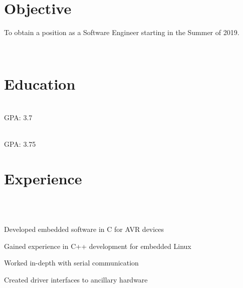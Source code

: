 \documentclass[]{deedy-resume-openfont}
\begin{document}
    
%
%
%
%
\section{Objective}
\raggedright
{}
To obtain a position as a Software Engineer starting in the Summer of 2019.

\descript{}\hfill \location{}\\
\section{Education}
\raggedright

\hfill {}\\
GPA: 3.7\\
\sectionsep
  

\hfill {}\\
GPA: 3.75\\
\sectionsep
%
%
\section{Experience}
\hfill{}\\
\hfill {}\\
\begin{tightemize}
	\item Developed embedded software in C for AVR devices
    \item Gained experience in C++ development for embedded Linux
    \item Worked in-depth with serial communication
    \item Created driver interfaces to ancillary hardware
\end{tightemize}
\sectionsep
\end{document}
